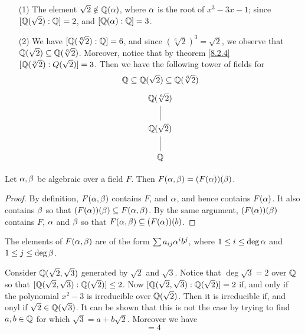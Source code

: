   \begin{example}\label{example_8.7}
    \begin{enumerate}
      \item[(1)] The element $\sqrt{2} \notin \mathbb{Q}(\alpha)$, where $\alpha$ is the root
        of  $x^3-3x-1$; since  $[\mathbb{Q}(\sqrt{2}) : \mathbb{Q}]=2$, and
        $[\mathbb{Q}(\alpha):\mathbb{Q}]=3$.

      \item[(2)] We have $[\mathbb{Q}(\sqrt[6]{2}):\mathbb{Q}]=6$, and since
        $(\sqrt[6]{2})^3=\sqrt{2}$, we observe that $\mathbb{Q}(\sqrt{2}) \subseteq
        \mathbb{Q}(\sqrt[6]{2})$. Moreover, notice that by theorem \ref{8.2.4}
        $[\mathbb{Q}(\sqrt[6]{2}):Q(\sqrt{2})]=3$. Then we have the following
        tower of fields for
        \begin{equation*}
          \mathbb{Q} \subseteq \mathbb{Q}(\sqrt{2}) \subseteq \mathbb{Q}(\sqrt[6]{2})
        \end{equation*}
        \[\begin{tikzcd}
          {\Q(\sqrt[6]{2})} \\
          {\Q(\sqrt{2})} \\
          {\Q}
          \arrow[no head, from=1-1, to=2-1]
          \arrow[no head, from=2-1, to=3-1]
        \end{tikzcd}\]
    \end{enumerate}
  \end{example}

  \begin{lemma}\label{lemma_8.2.5}
    Let $\alpha,\beta$ be algebraic over a field  $F$. Then  $F(\alpha,\beta)=(F(\alpha))(\beta)$.
  \end{lemma}
  \begin{proof}
    By definition, $F(\alpha,\beta)$ contains $F$, and  $\alpha$, and hence contains
    $F(\alpha)$. It also contains $\beta$ so that  $(F(\alpha))(\beta) \subseteq  F(\alpha,\beta)$.
    By the same argument, $(F(\alpha))(\beta)$ contains $F$,  $\alpha$ and  $\beta$ so that
    $F(\alpha,\beta) \subseteq (F(\alpha))(b)$.
  \end{proof}
  \begin{corollary}
    The elements of $F(\alpha,\beta)$ are of the form $\sum{a_{ij}\alpha^ib^j}$, where $1
    \leq i \leq \deg{\alpha}$ and $1 \leq j \leq \deg{\beta}$.
  \end{corollary}

  \begin{example}\label{example_8.8}
    Consider $\mathbb{Q}(\sqrt{2},\sqrt{3})$ generated by $\sqrt{2}$ and $\sqrt{3}$.
    Notice that $\deg{\sqrt{3}}=2$ over $\mathbb{Q}$ so that $[\mathbb{Q}(\sqrt{2},\sqrt{3}) :
    \mathbb{Q}(\sqrt{2})] \leq 2$. Now $[\mathbb{Q}(\sqrt{2},\sqrt{3}):\mathbb{Q}(\sqrt{2})]=2$ if, and
    only if the polynomial  $x^2-3$ is irreducible over  $\mathbb{Q}(\sqrt{2})$. Then
    it is irreducible if, and onyl if $\sqrt{2} \in \mathbb{Q}(\sqrt{3})$. It can be
    shown that this is not the case by trying to find $a,b \in \mathbb{Q}$ for which
    $\sqrt{3}=a+b\sqrt{2}$. Moreover we have
    \begin{equation*}
      [\Q(\sqrt{2},\sqrt{3}):\Q]=4
    \end{equation*}
  \end{example}

